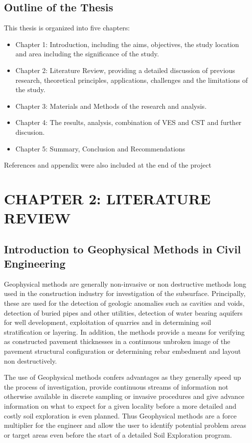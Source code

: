 \documentclass[12pt,a4paper]{report}
\begin{document}
\newpage
\section{Outline of the Thesis}
This thesis is organized into five chapters:
\begin{itemize}
    \item Chapter 1: Introduction, including the aims, objectives, the study location and area including the significance of the study.
    \item Chapter 2: Literature Review, providing a detailed discussion of previous research, theoretical principles, applications, challenges and the limitations of the study.
    \item Chapter 3: Materials and Methods of the research and analysis.
    \item Chapter 4: The results, analysis, combination of VES and CST and further discusion.
    \item Chapter 5: Summary, Conclusion and Recommendations
\end{itemize}
References and appendix were also included at the end of the project

\chapter{CHAPTER 2: LITERATURE REVIEW}

\section{Introduction to Geophysical Methods in Civil Engineering}
Geophysical methods are generally non-invasive or non destructive methods long used in the construction industry for investigation of the subsurface. Principally, these are used for the detection of geologic anomalies such as cavities and voids, detection of buried pipes and other utilities, detection of water bearing aquifers for well development, exploitation of quarries and in determining soil stratification or layering. In addition, the methods provide a means for verifying as constructed pavement thicknesses in a continuous unbroken image of the pavement structural configuration or determining rebar embedment and layout non destructively.

The use of Geophysical methods confers advantages as they generally speed up the process of investigation, provide continuous streams of information not otherwise available in discrete sampling or invasive procedures and give advance information on what to expect for a given locality before a more detailed and costly soil exploration is even planned. Thus Geophysical methods are a force multiplier for the engineer and allow the user to identify potential problem areas or target areas even before the start of a detailed Soil Exploration program.
\end{document}
